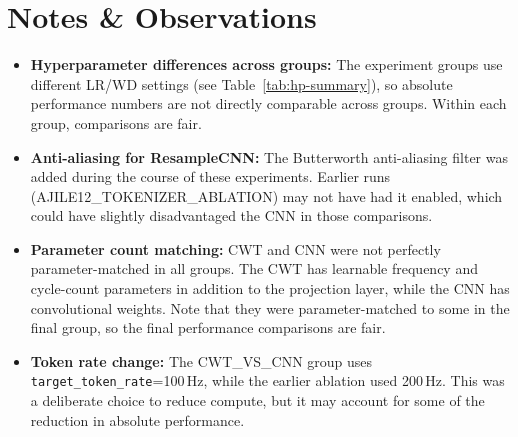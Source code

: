 \documentclass[11pt, a4paper]{article}
\begin{document}
\section{Notes \& Observations}
\label{sec:notes}

\begin{itemize}
      \item \textbf{Hyperparameter differences across groups:} The
            experiment groups use different LR/WD settings (see
            Table~\ref{tab:hp-summary}), so absolute performance numbers
            are not directly comparable across groups. Within each group,
            comparisons are fair.

      \item \textbf{Anti-aliasing for ResampleCNN:} The Butterworth
            anti-aliasing filter was added during the course of these
            experiments. Earlier runs (AJILE12\_TOKENIZER\_ABLATION) may
            not have had it enabled, which could have slightly
            disadvantaged the CNN in those comparisons.

      \item \textbf{Parameter count matching:} CWT and CNN were not
            perfectly parameter-matched in all groups. The CWT has
            learnable frequency and cycle-count parameters in addition
            to the projection layer, while the CNN has convolutional
            weights. Note that they were parameter-matched to some
            in the final group, so the final performance comparisons are fair.

      \item \textbf{Token rate change:} The CWT\_VS\_CNN group uses
            \texttt{target\_token\_rate}=100\,Hz, while the earlier
            ablation used 200\,Hz. This was a deliberate choice to
            reduce compute, but it may account for some of the
            reduction in absolute performance.
\end{itemize}
\end{document}
